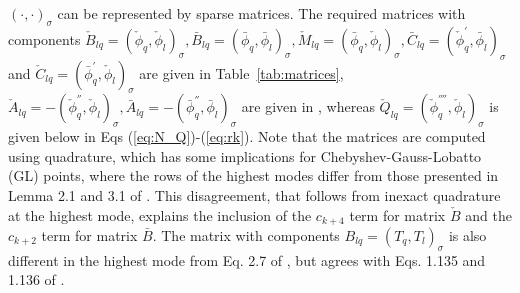 \documentclass[preprint]{elsarticle}
\newcommand{\N}[1]{\check{#1}}
\newcommand{\D}[1]{\bar{#1}}
\begin{document}
$(\cdot, \cdot)_{\sigma}$ can be represented by sparse matrices.
The required matrices with components $ \N{B}_{lq} = ( \N{\phi}_q, 
\N{\phi}_l)_{\sigma}, \D{B}_{lq} = ( \D{\phi}_q, 
\D{\phi}_l)_{\sigma}, \N{M}_{lq} = ( \D{\phi}_q, 
\N{\phi}_l)_{\sigma}, \D{C}_{lq} = (\N{\phi}_q^{'}, \D{\phi}_l)_{\sigma}$ and 
$ \N{C}_{lq} = (\D{\phi}_q^{'}, \N{\phi}_l)_{\sigma}$ are given in Table~\ref{tab:matrices}, $\N{A}_{lq}= -( \N{\phi}_q^{''}, 
\N{\phi}_l)_{\sigma}, \D{A}_{lq}= -( \D{\phi}_q^{''}, \D{\phi}_l)_{\sigma}$ are given in \cite{Shen95}, whereas $\N{Q}_{lq} = (\N{\phi}^{''''}_q, \N{\phi}_l)_{\sigma}$ is given below in Eqs (\ref{eq:N_Q})-(\ref{eq:rk}). Note that the matrices are computed using quadrature, which has some implications for Chebyshev-Gauss-Lobatto (GL) points, where the rows of the highest modes differ from those presented in Lemma 2.1 and 3.1 of \cite{Shen95}. This disagreement, that follows from inexact quadrature at the highest mode, explains the inclusion of the $c_{k+4}$ term for matrix $\N{B}$ and the $c_{k+2}$ term for matrix $\D{B}$. The matrix with components $B_{lq}=(T_q, T_l)_{\sigma}$ is also different in the highest mode from Eq. 2.7 of \cite{Shen95}, but agrees with Eqs. 1.135 and 1.136 of \cite{kopriva09}.
\end{document}

